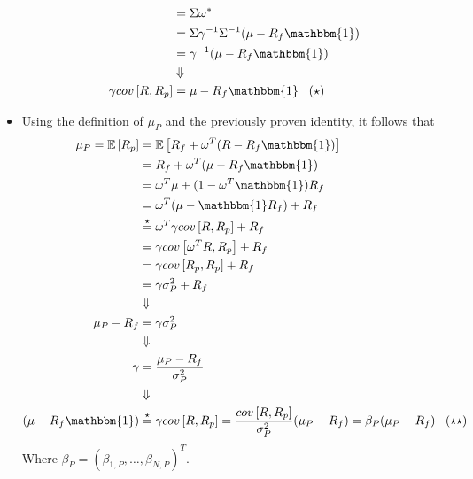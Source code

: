\documentclass[10pt]{article}
\newcommand{\Ebb}{\mathbb{E}}
\newenvironment{exercise}[2][Exercise]{\begin{trivlist}
  \item[\hskip \labelsep {\bfseries #1}\hskip \labelsep {\bfseries #2.}]}{\end{trivlist}}
\begin{document}
\begin{exercise}{1}
\begin{itemize}
\begin{align*}
        &= \Sigma \omega^* \\
        &= \Sigma \gamma^{-1} \Sigma^{-1} (\mu - R_f \mathbbm{1}) \\
        &=\gamma^{-1}(\mu - R_f \mathbbm{1}) \\
        &\Downarrow \\
          \gamma cov\left[ R, R_p \right]&= \mu - R_f\mathbbm{1} \;\;\; (\star)
      \end{align*}
      \item
        Using the definition of $\mu_P$ and the previously proven identity, it
        follows that
        \begin{align*}
          \mu_P = \Ebb\left[ R_p \right] &= \Ebb\left[ R_f + \omega^T(R - R_f\mathbbm{1}) \right] \\
          &= R_f + \omega^T ( \mu - R_f \mathbbm{1}) \\                                         &= \omega^T \mu + (1 - \omega^T \mathbbm{1}) R_f \\
          &= \omega^T(\mu - \mathbbm{1}R_f) + R_f \\
          &\stackrel{\star}{=} \omega^T\gamma cov\left[ R, R_p \right] + R_f \\
          &= \gamma cov \left[ \omega^TR, R_p \right]+ R_f \\
          &= \gamma cov \left[ R_p, R_p \right] + R_f\\
          &= \gamma \sigma^2_P  + R_f\\
          &\Downarrow \\
          \mu_P - R_f &= \gamma \sigma_P^2\\
          &\Downarrow \\
          \gamma &= \frac{\mu_P - R_f}{\sigma_P^2}\\
          & \Downarrow \\
          (\mu - R_f \mathbbm{1}) &\stackrel{\star}{=} \gamma cov\left[ R, R_p \right] = \frac{cov\left[ R, R_p \right]}{\sigma_P^2} (\mu_P - R_f) = \beta_{P} (\mu_P - R_f) \;\;\; (\star \star)
          \end{align*}
          Where $\beta_{P} = (\beta_{1, P}, \ldots, \beta_{N, P})^T$.


\end{itemize}
\end{exercise}
\end{document}
